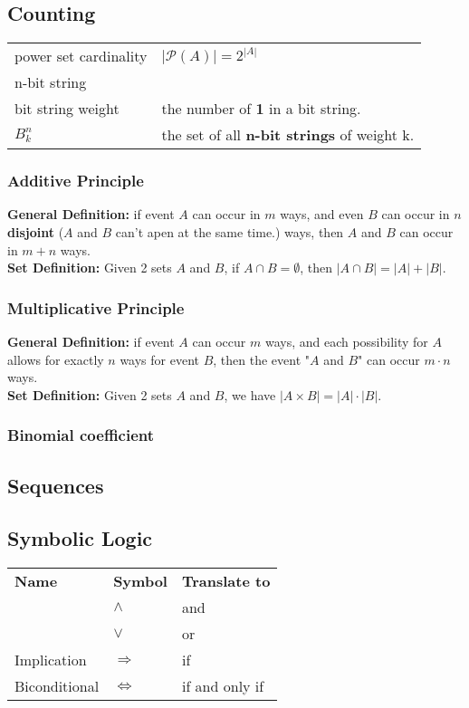 \documentclass[5pt]{article}
\begin{document}
\begin{multicols}{2}
\subsection{Counting}

\begin{tabular}{ll}
    power set cardinality   & $|\mathcal{P}(A)|=2^{|A|}$\\
    n-bit string            & \\
    bit string weight       & the number of \textbf{1} in a bit string.\\
    $B^n_k$                 & the set of all \textbf{n-bit strings} of weight k.\\
\end{tabular}

\subsubsection{Additive Principle}
\textbf{General Definition:} 
if event $A$ can occur in $m$ ways, and even $B$ can occur in $n$ \textbf{disjoint} ($A$ and $B$ can't apen at the same time.) ways, then $A$ and $B$ can occur in $m+n$ ways.\\   
\textbf{Set Definition:} Given 2 sets $A$ and $B$, if $A\cap B =\emptyset$, then $|A\cap B| = |A| + |B|$.


\subsubsection{Multiplicative Principle}
\textbf{General Definition:} if event $A$ can occur $m$ ways, and each possibility for $A$ allows for exactly $n$ ways for event $B$, then the event "$A$ and $B$" can occur $m\cdot n$ ways.\\
\textbf{Set Definition:} Given 2 sets $A$ and $B$, we have $|A\times B|=|A|\cdot|B|$.

\subsubsection{Binomial coefficient}

\subsection{Sequences}

\subsection{Symbolic Logic}
\begin{tabular}{lll}
    \textbf{Name} & \textbf{Symbol} & \textbf{Translate to}\\
                 & $\land$ & and\\
                 & $\lor$ & or\\
   Implication   & $\Rightarrow$ & if\\
   Biconditional & $\Leftrightarrow$ & if and only if\\
    

\end{tabular}
\end{multicols}
\end{document}
